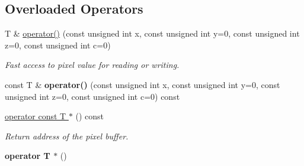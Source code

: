 \subsection*{Overloaded Operators}
\label{_amgrp10ba48134b3a5986e7dba07127eb6a73}
 \begin{DoxyCompactItemize}
\item 
T \& \hyperlink{structcimg__library_1_1CImg_accb8526e4303186fb6246ac1301fdf66}{operator()} (const unsigned int x, const unsigned int y=0, const unsigned int z=0, const unsigned int c=0)
\begin{DoxyCompactList}\small\item\em Fast access to pixel value for reading or writing. \item\end{DoxyCompactList}\item 
\hypertarget{structcimg__library_1_1CImg_a68f48396bd3f78312b1f460139aef94d}{
const T \& {\bfseries operator()} (const unsigned int x, const unsigned int y=0, const unsigned int z=0, const unsigned int c=0) const }
\label{structcimg__library_1_1CImg_a68f48396bd3f78312b1f460139aef94d}

\item 
\hypertarget{structcimg__library_1_1CImg_af015545c1c88375a1fff0fd898f0d34e}{
\hyperlink{structcimg__library_1_1CImg_af015545c1c88375a1fff0fd898f0d34e}{operator const T $\ast$} () const }
\label{structcimg__library_1_1CImg_af015545c1c88375a1fff0fd898f0d34e}

\begin{DoxyCompactList}\small\item\em Return address of the pixel buffer. \item\end{DoxyCompactList}\item 
\hypertarget{structcimg__library_1_1CImg_a4e20322854ce5d78776cdaf1a87aacd9}{
{\bfseries operator T $\ast$} ()}
\label{structcimg__library_1_1CImg_a4e20322854ce5d78776cdaf1a87aacd9}


\end{DoxyCompactItemize}
